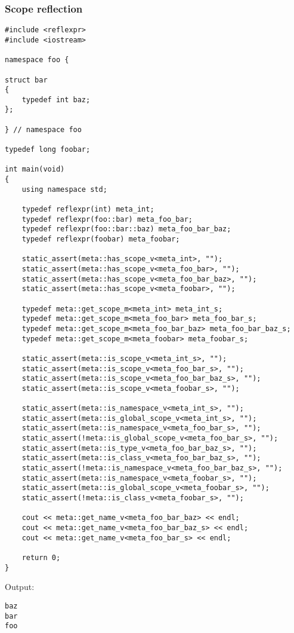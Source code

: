 \subsubsection{Scope reflection}

\begin{verbatim}
#include <reflexpr>
#include <iostream>

namespace foo {

struct bar
{
	typedef int baz;
};

} // namespace foo

typedef long foobar;

int main(void)
{
	using namespace std;

	typedef reflexpr(int) meta_int;
	typedef reflexpr(foo::bar) meta_foo_bar;
	typedef reflexpr(foo::bar::baz) meta_foo_bar_baz;
	typedef reflexpr(foobar) meta_foobar;

	static_assert(meta::has_scope_v<meta_int>, "");
	static_assert(meta::has_scope_v<meta_foo_bar>, "");
	static_assert(meta::has_scope_v<meta_foo_bar_baz>, "");
	static_assert(meta::has_scope_v<meta_foobar>, "");

	typedef meta::get_scope_m<meta_int> meta_int_s;
	typedef meta::get_scope_m<meta_foo_bar> meta_foo_bar_s;
	typedef meta::get_scope_m<meta_foo_bar_baz> meta_foo_bar_baz_s;
	typedef meta::get_scope_m<meta_foobar> meta_foobar_s;

	static_assert(meta::is_scope_v<meta_int_s>, "");
	static_assert(meta::is_scope_v<meta_foo_bar_s>, "");
	static_assert(meta::is_scope_v<meta_foo_bar_baz_s>, "");
	static_assert(meta::is_scope_v<meta_foobar_s>, "");

	static_assert(meta::is_namespace_v<meta_int_s>, "");
	static_assert(meta::is_global_scope_v<meta_int_s>, "");
	static_assert(meta::is_namespace_v<meta_foo_bar_s>, "");
	static_assert(!meta::is_global_scope_v<meta_foo_bar_s>, "");
	static_assert(meta::is_type_v<meta_foo_bar_baz_s>, "");
	static_assert(meta::is_class_v<meta_foo_bar_baz_s>, "");
	static_assert(!meta::is_namespace_v<meta_foo_bar_baz_s>, "");
	static_assert(meta::is_namespace_v<meta_foobar_s>, "");
	static_assert(meta::is_global_scope_v<meta_foobar_s>, "");
	static_assert(!meta::is_class_v<meta_foobar_s>, "");

	cout << meta::get_name_v<meta_foo_bar_baz> << endl;
	cout << meta::get_name_v<meta_foo_bar_baz_s> << endl;
	cout << meta::get_name_v<meta_foo_bar_s> << endl;

	return 0;
}
\end{verbatim}

Output:

\begin{verbatim}
baz
bar
foo
\end{verbatim}

